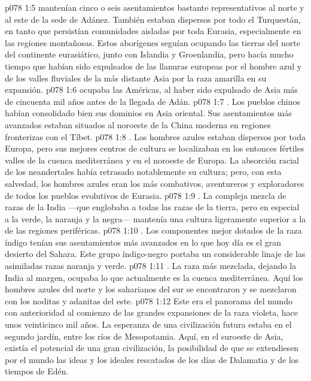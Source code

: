 \vs p078 1:5  mantenían cinco o seis asentamientos bastante representativos al norte y al este de la sede de Adánez. También estaban dispersos por todo el Turquestán, en tanto que persistían comunidades aisladas por toda Eurasia, especialmente en las regiones montañosas. Estos aborígenes seguían ocupando las tierras del norte del continente eurasiático, junto con Islandia y Groenlandia, pero hacía mucho tiempo que habían sido expulsados de las llanuras europeas por el hombre azul y de los valles fluviales de la más distante Asia por la raza amarilla en su expansión.
\vs p078 1:6  ocupaba las Américas, al haber sido expulsado de Asia más de cincuenta mil años antes de la llegada de Adán.
\vs p078 1:7 . Los pueblos chinos habían consolidado bien sus dominios en Asia oriental. Sus asentamientos más avanzados estaban situados al noroeste de la China moderna en regiones fronterizas con el Tíbet.
\vs p078 1:8 . Los hombres azules estaban dispersos por toda Europa, pero sus mejores centros de cultura se localizaban en los entonces fértiles valles de la cuenca mediterránea y en el noroeste de Europa. La absorción racial de los neandertales había retrasado notablemente su cultura; pero, con esta salvedad, los hombres azules eran los más combativos, aventureros y exploradores de todos los pueblos evolutivos de Eurasia.
\vs p078 1:9 . La compleja mezcla de razas de la India ---que englobaba a todas las razas de la tierra, pero en especial a la verde, la naranja y la negra--- mantenía una cultura ligeramente superior a la de las regiones periféricas.
\vs p078 1:10 . Los componentes mejor dotados de la raza índigo tenían sus asentamientos más avanzados en lo que hoy día es el gran desierto del Sahara. Este grupo índigo\hyp{}negro portaba un considerable linaje de las asimiladas razas naranja y verde.
\vs p078 1:11 . La raza más mezclada, dejando la India al margen, ocupaba lo que actualmente es la cuenca mediterránea. Aquí los hombres azules del norte y los saharianos del sur se encontraron y se mezclaron con los noditas y adanitas del este.
\vs p078 1:12 \pc Este era el panorama del mundo con anterioridad al comienzo de las grandes expansiones de la raza violeta, hace unos veinticinco mil años. La esperanza de una civilización futura estaba en el segundo jardín, entre los ríos de Mesopotamia. Aquí, en el suroeste de Asia, existía el potencial de una gran civilización, la posibilidad de que se extendiesen por el mundo las ideas y los ideales rescatados de los días de Dalamatia y de los tiempos de Edén.
